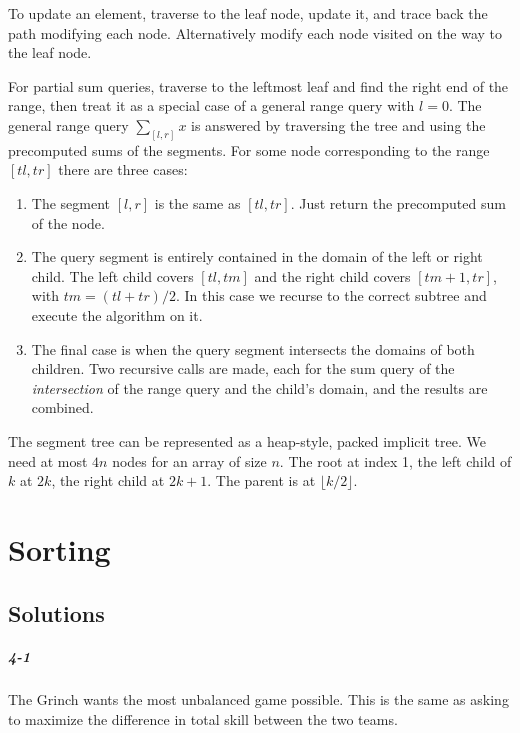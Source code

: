 \documentclass{report}
\begin{document}

To update an element, traverse to the leaf node, update it, and trace back the path modifying each node. Alternatively modify each node visited on the way to the leaf node.

For partial sum queries, traverse to the leftmost leaf and find the right end of the range, then treat it as a special case of a general range query with $l=0$. The general range query $\sum_{[l,r]} x$ is answered by traversing the tree and using the precomputed sums of the segments. For some node corresponding to the range $[tl,tr]$ there are three cases:

\begin{enumerate}
	\item The segment $[l,r]$ is the same as $[tl,tr]$. Just return the precomputed sum of the node.
	\item The query segment is entirely contained in the domain of the left or right child. The left child covers $[tl,tm]$ and the right child covers $[tm+1, tr]$, with $tm=(tl+tr)/2$. In this case we recurse to the correct subtree and execute the algorithm on it.
	\item The final case is when the query segment intersects the domains of both children. Two recursive calls are made, each for the sum query of the \emph{intersection} of the range query and the child's domain, and the results are combined.
\end{enumerate}

The segment tree can be represented as a heap-style, packed implicit tree. We need at most $4n$ nodes for an array of size $n$. The root at index 1, the left child of $k$ at $2k$, the right child at $2k+1$. The parent is at $\lfloor k/2\rfloor$.

\chapter{Sorting}

\section*{Solutions}

\paragraph{4-1} The Grinch wants the most unbalanced game possible. This is the same as asking to maximize the difference in total skill between the two teams.
\end{document}

